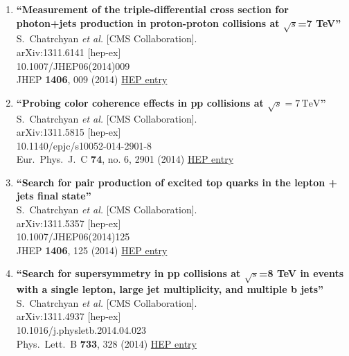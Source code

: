\documentclass{article}
\begin{document}
\begin{enumerate}
\item%
{\bf ``Measurement of the triple-differential cross section for photon+jets production in proton-proton collisions at $\sqrt{s}$=7 TeV''}
  \\{}S.~Chatrchyan {\it et al.} [CMS Collaboration].
  \\{}arXiv:1311.6141 [hep-ex]
    \\{}10.1007/JHEP06(2014)009
\\{}JHEP {\bf 1406}, 009 (2014) %
\href{http://inspirehep.net/record/1266056}{HEP entry}


\item%
{\bf ``Probing color coherence effects in pp collisions at $\sqrt{s}=7\,\text {TeV} $''}
  \\{}S.~Chatrchyan {\it et al.} [CMS Collaboration].
  \\{}arXiv:1311.5815 [hep-ex]
    \\{}10.1140/epjc/s10052-014-2901-8
\\{}Eur.\ Phys.\ J.\ C {\bf 74}, no. 6, 2901 (2014) %
\href{http://inspirehep.net/record/1265659}{HEP entry}


\item%
{\bf ``Search for pair production of excited top quarks in the lepton + jets final state''}
  \\{}S.~Chatrchyan {\it et al.} [CMS Collaboration].
  \\{}arXiv:1311.5357 [hep-ex]
    \\{}10.1007/JHEP06(2014)125
\\{}JHEP {\bf 1406}, 125 (2014) %
\href{http://inspirehep.net/record/1265512}{HEP entry}


\item%
{\bf ``Search for supersymmetry in pp collisions at $\sqrt{s}$=8 TeV in events with a single lepton, large jet multiplicity, and multiple b jets''}
  \\{}S.~Chatrchyan {\it et al.} [CMS Collaboration].
  \\{}arXiv:1311.4937 [hep-ex]
    \\{}10.1016/j.physletb.2014.04.023
\\{}Phys.\ Lett.\ B {\bf 733}, 328 (2014) %
\href{http://inspirehep.net/record/1265220}{HEP entry}



\end{enumerate}
\end{document}
